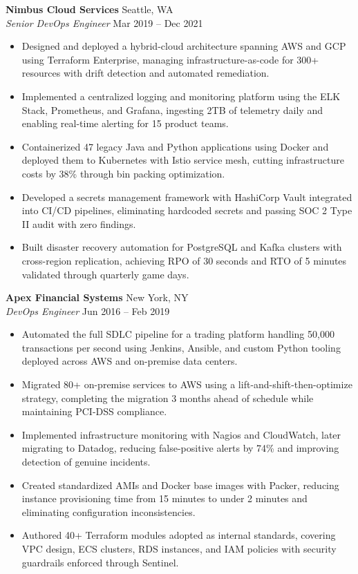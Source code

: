 \documentclass[11pt,a4paper]{article}
\newcommand{\roleheader}[4]{%
  {\bfseries\normalsize\color{primary}#1} \hfill {\normalsize\color{mediumgray}#2}\\[2pt]
  {\itshape\color{accent}#3} \hfill {\footnotesize\color{mediumgray}#4}\\[4pt]
}
\begin{document}
\roleheader{Nimbus Cloud Services}{Seattle, WA}{Senior DevOps Engineer}{Mar 2019 -- Dec 2021}
\begin{itemize}
  \item Designed and deployed a hybrid-cloud architecture spanning AWS and GCP using Terraform Enterprise, managing infrastructure-as-code for 300+ resources with drift detection and automated remediation.
  \item Implemented a centralized logging and monitoring platform using the ELK Stack, Prometheus, and Grafana, ingesting 2TB of telemetry daily and enabling real-time alerting for 15 product teams.
  \item Containerized 47 legacy Java and Python applications using Docker and deployed them to Kubernetes with Istio service mesh, cutting infrastructure costs by 38\% through bin packing optimization.
  \item Developed a secrets management framework with HashiCorp Vault integrated into CI/CD pipelines, eliminating hardcoded secrets and passing SOC 2 Type II audit with zero findings.
  \item Built disaster recovery automation for PostgreSQL and Kafka clusters with cross-region replication, achieving RPO of 30 seconds and RTO of 5 minutes validated through quarterly game days.
\end{itemize}

\roleheader{Apex Financial Systems}{New York, NY}{DevOps Engineer}{Jun 2016 -- Feb 2019}
\begin{itemize}
  \item Automated the full SDLC pipeline for a trading platform handling 50,000 transactions per second using Jenkins, Ansible, and custom Python tooling deployed across AWS and on-premise data centers.
  \item Migrated 80+ on-premise services to AWS using a lift-and-shift-then-optimize strategy, completing the migration 3 months ahead of schedule while maintaining PCI-DSS compliance.
  \item Implemented infrastructure monitoring with Nagios and CloudWatch, later migrating to Datadog, reducing false-positive alerts by 74\% and improving detection of genuine incidents.
  \item Created standardized AMIs and Docker base images with Packer, reducing instance provisioning time from 15 minutes to under 2 minutes and eliminating configuration inconsistencies.
  \item Authored 40+ Terraform modules adopted as internal standards, covering VPC design, ECS clusters, RDS instances, and IAM policies with security guardrails enforced through Sentinel.
\end{itemize}
\end{document}
